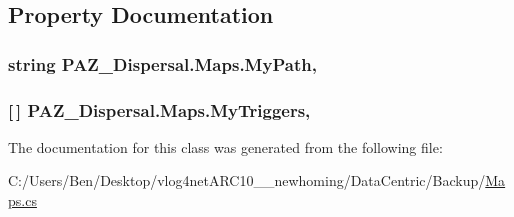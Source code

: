 \subsection{Property Documentation}
\hypertarget{class_p_a_z___dispersal_1_1_maps_a5d602f630a99fd27121e41a8fabb357e}{
\subsubsection[{My\-Path}]{\setlength{\rightskip}{0pt plus 5cm}string P\-A\-Z\-\_\-\-Dispersal.\-Maps.\-My\-Path\hspace{0.3cm}{\ttfamily [get]}, {\ttfamily [set]}}}\label{class_p_a_z___dispersal_1_1_maps_a5d602f630a99fd27121e41a8fabb357e}
\hypertarget{class_p_a_z___dispersal_1_1_maps_ae71dfdf5fb80764a2034cb920e638601}{
\subsubsection[{My\-Triggers}]{ \mbox{[}$\,$\mbox{]} P\-A\-Z\-\_\-\-Dispersal.\-Maps.\-My\-Triggers\hspace{0.3cm}{\ttfamily [get]}, {\ttfamily [set]}}}\label{class_p_a_z___dispersal_1_1_maps_ae71dfdf5fb80764a2034cb920e638601}


The documentation for this class was generated from the following file\-:\begin{DoxyCompactItemize}
\item 
C\-:/\-Users/\-Ben/\-Desktop/vlog4net\-A\-R\-C10\-\_\-\_\-newhoming/\-Data\-Centric/\-Backup/\hyperlink{_backup_2_maps_8cs}{Maps.\-cs}\end{DoxyCompactItemize}
